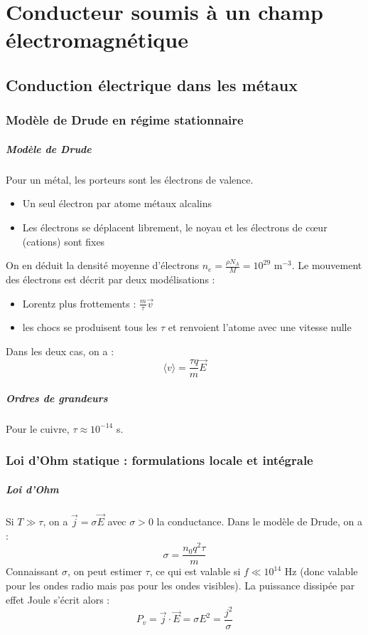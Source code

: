 \documentclass[french]{book}
\theoremstyle{plain}
\theoremstyle{definition}
\theoremstyle{remark}
\begin{document}
\chapter{Conducteur soumis à un champ électromagnétique}
\localtableofcontents
\section{Conduction électrique dans les métaux}
\subsection{Modèle de Drude en régime stationnaire}
\paragraph{Modèle de Drude} Pour un métal, les porteurs sont les électrons de valence. 
\begin{itemize}
	\item Un seul électron par atome métaux alcalins
	\item Les électrons se déplacent librement, le noyau et les électrons de cœur (cations) sont fixes
\end{itemize}
On en déduit la densité moyenne d'électrons $n_e=\displaystyle\frac{\rho N_A}{M}=10^{29}$ m$^{-3}$. Le mouvement des électrons est décrit par deux modélisations : 
\begin{itemize}
	\item Lorentz plus frottements : $\displaystyle\frac{m}{\tau}\overrightarrow{v}$
	\item les chocs se produisent tous les $\tau$ et renvoient l'atome avec une vitesse nulle
\end{itemize}
Dans les deux cas, on a : $$\langle v\rangle=\frac{\tau q}{m}\overrightarrow{E}$$
\paragraph{Ordres de grandeurs} Pour le cuivre, $\tau\approx 10^{-14}$ s.
\subsection{Loi d'Ohm statique : formulations locale et intégrale}
\paragraph{Loi d'Ohm} Si $T\gg\tau$, on a $\overrightarrow{j}=\sigma\overrightarrow{E}$ avec $\sigma>0$ la conductance. Dans le modèle de Drude, on a : $$\sigma=\frac{n_0q^2\tau}{m}$$ Connaissant $\sigma$, on peut estimer $\tau$, ce qui est valable si $f\ll 10^{14}$ Hz (donc valable pour les ondes radio mais pas pour les ondes visibles). La puissance dissipée par effet Joule s'écrit alors : $$P_v=\overrightarrow{j}\cdot\overrightarrow{E}=\sigma E^2=\frac{j^2}{\sigma}$$
\end{document}
